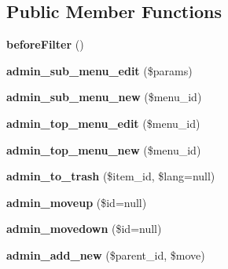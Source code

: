 \subsection*{\-Public \-Member \-Functions}
\begin{DoxyCompactItemize}
\item 
\hypertarget{class_menus_controller_af518e7bfb9e70dbc3b641c6e0d5ede85}{
{\bfseries before\-Filter} ()}
\label{class_menus_controller_af518e7bfb9e70dbc3b641c6e0d5ede85}

\item 
\hypertarget{class_menus_controller_aaa947a2cb0fdbadc3dae969b540d18e4}{
{\bfseries admin\-\_\-sub\-\_\-menu\-\_\-edit} (\$params)}
\label{class_menus_controller_aaa947a2cb0fdbadc3dae969b540d18e4}

\item 
\hypertarget{class_menus_controller_abe96fe589fe3d57717d6839c36df441a}{
{\bfseries admin\-\_\-sub\-\_\-menu\-\_\-new} (\$menu\-\_\-id)}
\label{class_menus_controller_abe96fe589fe3d57717d6839c36df441a}

\item 
\hypertarget{class_menus_controller_ae5b222c81de269b5cd0b3ffb7686704a}{
{\bfseries admin\-\_\-top\-\_\-menu\-\_\-edit} (\$menu\-\_\-id)}
\label{class_menus_controller_ae5b222c81de269b5cd0b3ffb7686704a}

\item 
\hypertarget{class_menus_controller_a17bb37497debe73e582a8fd573c5e24f}{
{\bfseries admin\-\_\-top\-\_\-menu\-\_\-new} (\$menu\-\_\-id)}
\label{class_menus_controller_a17bb37497debe73e582a8fd573c5e24f}

\item 
\hypertarget{class_menus_controller_ab56a2d9c6190b2d518901b98701eb201}{
{\bfseries admin\-\_\-to\-\_\-trash} (\$item\-\_\-id, \$lang=null)}
\label{class_menus_controller_ab56a2d9c6190b2d518901b98701eb201}

\item 
\hypertarget{class_menus_controller_a99432876d4e81eff9b4a1e8f96243cfa}{
{\bfseries admin\-\_\-moveup} (\$id=null)}
\label{class_menus_controller_a99432876d4e81eff9b4a1e8f96243cfa}

\item 
\hypertarget{class_menus_controller_ada6e245b365f3fc176dc9d325320d4b4}{
{\bfseries admin\-\_\-movedown} (\$id=null)}
\label{class_menus_controller_ada6e245b365f3fc176dc9d325320d4b4}

\item 
\hypertarget{class_menus_controller_ad883a763b934c77c67b3da441e47e471}{
{\bfseries admin\-\_\-add\-\_\-new} (\$parent\-\_\-id, \$move)}
\label{class_menus_controller_ad883a763b934c77c67b3da441e47e471}


\end{DoxyCompactItemize}
